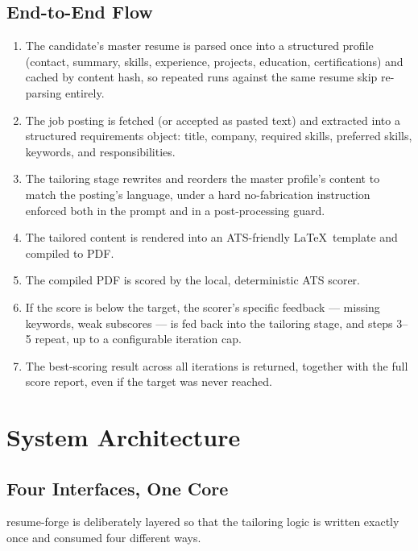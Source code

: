 \documentclass[10.5pt,letterpaper]{article}
\begin{document}
\subsection{End-to-End Flow}
\begin{enumerate}
  \item The candidate's master resume is parsed once into a structured profile
    (contact, summary, skills, experience, projects, education, certifications) and cached
    by content hash, so repeated runs against the same resume skip re-parsing entirely.
  \item The job posting is fetched (or accepted as pasted text) and extracted into a
    structured requirements object: title, company, required skills, preferred skills,
    keywords, and responsibilities.
  \item The tailoring stage rewrites and reorders the master profile's content to match the
    posting's language, under a hard no-fabrication instruction enforced both in the prompt
    and in a post-processing guard.
  \item The tailored content is rendered into an ATS-friendly \LaTeX\ template and compiled to
    PDF.
  \item The compiled PDF is scored by the local, deterministic ATS scorer.
  \item If the score is below the target, the scorer's specific feedback --- missing
    keywords, weak subscores --- is fed back into the tailoring stage, and steps 3--5 repeat,
    up to a configurable iteration cap.
  \item The best-scoring result across all iterations is returned, together with the full
    score report, even if the target was never reached.
\end{enumerate}

\newpage

\section{System Architecture}

\subsection{Four Interfaces, One Core}
resume-forge is deliberately layered so that the tailoring logic is written exactly once and
consumed four different ways.
\end{document}
